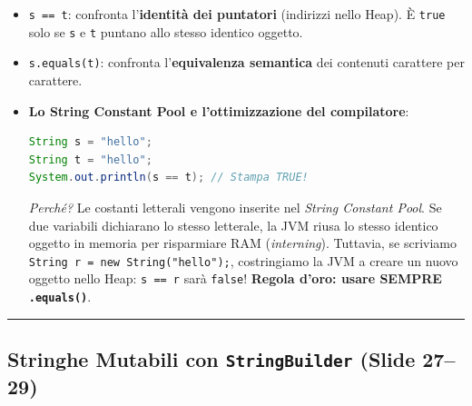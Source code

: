 \documentclass[11pt,a4paper,oneside]{report}
\newcommand{\passthrough}[1]{#1}
\begin{document}
\begin{itemize}
  \begin{itemize}
  \item
    \passthrough{\lstinline!s == t!}: confronta l'\textbf{identità dei
    puntatori} (indirizzi nello Heap). È \passthrough{\lstinline!true!}
    solo se \passthrough{\lstinline!s!} e \passthrough{\lstinline!t!}
    puntano allo stesso identico oggetto.
  \item
    \passthrough{\lstinline!s.equals(t)!}: confronta
    l'\textbf{equivalenza semantica} dei contenuti carattere per
    carattere.
  \item
    \textbf{Lo String Constant Pool e l'ottimizzazione del compilatore}:

\begin{lstlisting}[language=Java]
String s = "hello";
String t = "hello";
System.out.println(s == t); // Stampa TRUE!
\end{lstlisting}

    \emph{Perché?} Le costanti letterali vengono inserite nel
    \emph{String Constant Pool}. Se due variabili dichiarano lo stesso
    letterale, la JVM riusa lo stesso identico oggetto in memoria per
    risparmiare RAM (\emph{interning}). Tuttavia, se scriviamo
    \passthrough{\lstinline!String r = new String("hello");!},
    costringiamo la JVM a creare un nuovo oggetto nello Heap:
    \passthrough{\lstinline!s == r!} sarà
    \passthrough{\lstinline!false!}! \textbf{Regola d'oro: usare SEMPRE
    \passthrough{\lstinline!.equals()!}}.
  \end{itemize}
\end{itemize}

\begin{center}\rule{0.5\linewidth}{0.5pt}\end{center}

\subsection{\texorpdfstring{Stringhe Mutabili con \texttt{StringBuilder}
(Slide
27--29)}{Stringhe Mutabili con StringBuilder (Slide 27--29)}}\label{chap06_stringhe-mutabili-con-stringbuilder-slide-2729}
\end{document}

